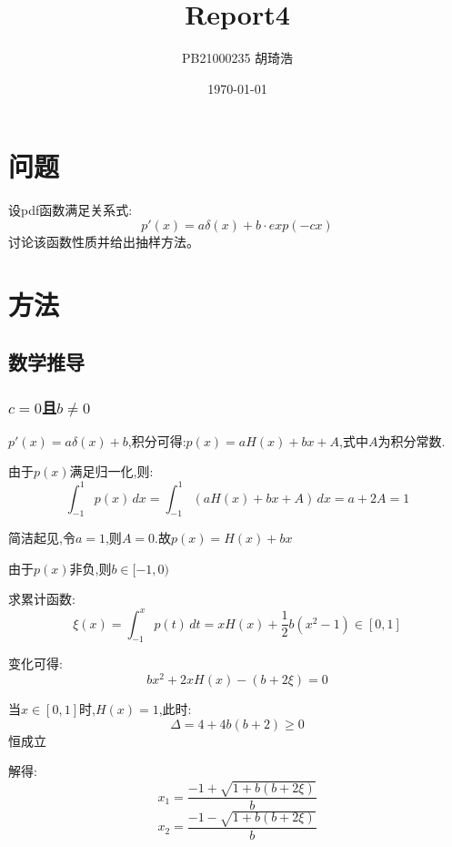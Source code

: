 \documentclass[UTF8]{ctexart}
\title{\textbf{Report4}}
\author{PB21000235 胡琦浩}
\date{\today}
\begin{document}
\maketitle
\section{问题}
设pdf函数满足关系式:
\begin{equation}
    p'(x)=a\delta (x)+b\cdot exp(-cx)
\end{equation}
讨论该函数性质并给出抽样方法。

\section{方法}
\subsection{数学推导}
\subsubsection{$c=0$且$b\neq 0$}
$p'(x)=a\delta (x)+b$,\quad 积分可得:$p(x)=aH(x)+bx+A$,式中$A$为积分常数.

由于$p(x)$满足归一化,则:
\begin{equation}
    \int_{-1}^{1} p(x) \,dx = \int_{-1}^{1} (aH(x)+bx+A) \,dx=a+2A=1  
\end{equation}

简洁起见,令$a=1$,则$A=0$.\quad 故$p(x)=H(x)+bx$

由于$p(x)$非负,则$b\in [-1,0)$

求累计函数:
\begin{equation}
    \xi(x)=\int_{-1}^{x} p(t) \,dt =xH(x)+\frac{1}{2}b(x^2-1)\in[0,1]
\end{equation}

变化可得:
\begin{equation}
    bx^2+2xH(x)-(b+2\xi )=0
\end{equation}

当$x\in [0,1]$时,$H(x)=1$,此时:
\begin{equation}
    \Delta =4+4b(b+2)\geq 0
\end{equation}
恒成立

解得:
\begin{equation}
    x_1=\frac{-1+\sqrt{1+b(b+2\xi )}}{b}
\end{equation}
\begin{equation}
    x_2=\frac{-1-\sqrt{1+b(b+2\xi) }}{b}
\end{equation}
\end{document}
